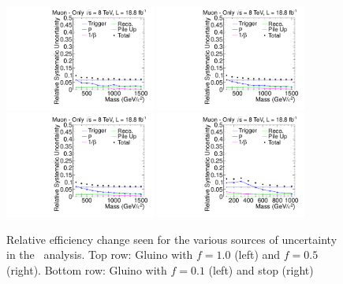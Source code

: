 \begin{figure}
\centering
  \includegraphics[clip=true, trim=0.0cm 0cm 2.8cm 0cm, width=0.44\textwidth]{figures/muonly/MoGluino_f100Uncertainty}
  \includegraphics[clip=true, trim=0.0cm 0cm 2.8cm 0cm, width=0.44\textwidth]{figures/muonly/MoGluino_f50Uncertainty} \\
  \includegraphics[clip=true, trim=0.0cm 0cm 2.8cm 0cm, width=0.44\textwidth]{figures/muonly/MoGluino_f10Uncertainty}
  \includegraphics[clip=true, trim=0.0cm 0cm 2.8cm 0cm, width=0.44\textwidth]{figures/muonly/MoStopUncertainty}
\caption{Relative efficiency change seen for the various sources of uncertainty in the \muononly\ analysis.
Top row: Gluino with $f=1.0$ (left) and $f=0.5$ (right).
Bottom row: Gluino with $f=0.1$ (left) and stop (right)
    \label{fig:MuOnlyUncSource}}
\end{figure}

